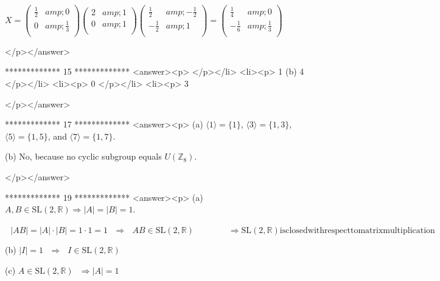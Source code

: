   \(X=\left(
\begin{array}{cc}
 \frac{1}{2} &amp; 0 \\
 0 &amp; \frac{1}{3} \\
\end{array}
\right)\left(
\begin{array}{cc}
 2 &amp; 1 \\
 0 &amp; 1 \\
\end{array}
\right)\left(
\begin{array}{cc}
 \frac{1}{2} &amp; -\frac{1}{2} \\
 -\frac{1}{2} &amp; 1 \\
\end{array}
\right) = \left(
\begin{array}{cc}
 \frac{1}{4} &amp; 0 \\
 -\frac{1}{6} &amp; \frac{1}{3} \\
\end{array}
\right)\)

</p></answer>


*************
15
*************
<answer><p>   </p></li>
<li><p>  1    (b)  4       </p></li>
<li><p> 0       </p></li>
<li><p> 3

</p></answer>


*************
17
*************
<answer><p> (a)  \(\langle 1\rangle  = \{1\}\),  \(\langle 3\rangle = \{1, 3\}\),  \(\langle 5\rangle  = \{1, 5\}\), and \(\langle 7\rangle  = \{1,
7\}\).



      (b)  No, because no cyclic subgroup equals \(U\left(\mathbb{Z}_8\right)\).

</p></answer>


*************
19
*************
<answer><p> (a)  \(A,B \in  \text{SL}(2,\mathbb{R}) \Rightarrow  \left| A\right| =\left| B\right| =1\).



       \(\text{     }\left| A B\right|  = \left| A\right| \cdot \left| B\right| = 1\cdot 1 = 1\text{    }\Rightarrow \text{   }A B \in \text{SL}(2,\mathbb{R})\quad
\quad \quad \quad \Rightarrow  \text{SL}(2,\mathbb{R}) \text{is} \text{closed} \text{with} \text{respect} \text{to} \text{matrix} \text{multiplication}\)



      (b)  \(\left| I\right| = 1\text{   }\Rightarrow \text{   }I \in \text{SL}(2,\mathbb{R})\)



      (c) \(A \in \text{SL}(2,\mathbb{R})\text{  }\Rightarrow  \left| A\right| = 1\)



